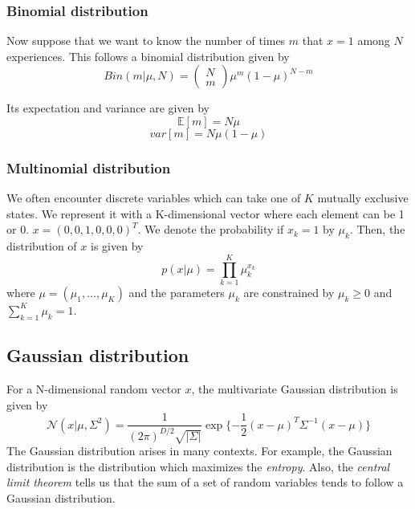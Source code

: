 \subsubsection{Binomial distribution}
Now suppose that we want to know the number of times $m$ that $x=1$ among $N$ experiences. This follows a binomial distribution given by
\begin{equation}
    Bin(m|\mu, N) = \left(\begin{array}{c}
        N \\ m
    \end{array}\right)
    \mu^{m} (1-\mu)^{N-m}
\end{equation}

Its expectation and variance are given by
\begin{equation}
    \mathbb{E}[m] = N\mu
\end{equation}
\begin{equation}
    var[m] = N\mu(1-\mu)
\end{equation}

\subsubsection{Multinomial distribution}
We often encounter discrete variables which can take one of $K$ mutually exclusive states. We represent it with a K-dimensional vector where each element can be 1 or 0. $x = (0, 0, 1, 0, 0, 0)^T$. We denote the probability if $x_k=1$ by $\mu_k$. Then, the distribution of $x$ is given by
\begin{equation}
    p(x|\mu) = \prod_{k=1}^{K} \mu_k^{x_k}
\end{equation}
where $\mu=(\mu_1, \dots, \mu_K)$ and the parameters $\mu_k$ are constrained by $\mu_k \ge 0$ and $\sum_{k=1}^K \mu_k = 1$.

\subsection{Gaussian distribution}
For a N-dimensional random vector $x$, the multivariate Gaussian distribution is given by
\begin{equation}
    \mathcal{N}(x|\mu,\Sigma^2) = \frac{1}{(2\pi)^{D/2}\sqrt{|\Sigma|}} \exp\{-\frac{1}{2}(x-\mu)^T \Sigma^{-1}(x-\mu)\}
\end{equation}
The Gaussian distribution arises in many contexts. For example, the Gaussian distribution is the distribution which maximizes the \textit{entropy}.
Also, the \textit{central limit theorem} tells us that the sum of a set of random variables tends to follow a Gaussian distribution.

